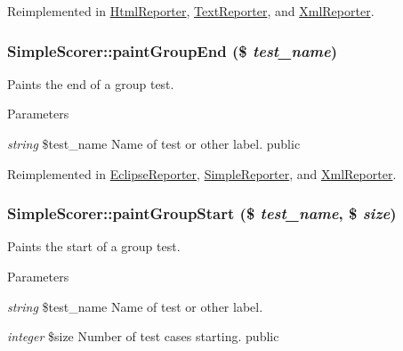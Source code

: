 Reimplemented in \hyperlink{class_html_reporter_ac759b018db079ff7f6cc45ee43d3ef12}{HtmlReporter}, \hyperlink{class_text_reporter_ac308a6d3632656270578474b0b752b06}{TextReporter}, and \hyperlink{class_xml_reporter_ac6997a24df6320a76066b801b1f99154}{XmlReporter}.\hypertarget{class_simple_scorer_a40b030cbba90f114374191cbed7d459d}{
\subsubsection[{paintGroupEnd}]{\setlength{\rightskip}{0pt plus 5cm}SimpleScorer::paintGroupEnd (\$ {\em test\_\-name})}}
\label{class_simple_scorer_a40b030cbba90f114374191cbed7d459d}
Paints the end of a group test. 
\begin{DoxyParams}{Parameters}
\item[{\em string}]\$test\_\-name Name of test or other label.  public \end{DoxyParams}


Reimplemented in \hyperlink{class_eclipse_reporter_aa0cb1e290d9ea75c0ac19efe06b55992}{EclipseReporter}, \hyperlink{class_simple_reporter_a2b6b699cadeb44f4dc666f3c94ac22be}{SimpleReporter}, and \hyperlink{class_xml_reporter_a448424e6e8bce6060c6ad6109fcb2300}{XmlReporter}.\hypertarget{class_simple_scorer_a738721074c609d1ced9010b57cd0779c}{
\subsubsection[{paintGroupStart}]{\setlength{\rightskip}{0pt plus 5cm}SimpleScorer::paintGroupStart (\$ {\em test\_\-name}, \/  \$ {\em size})}}
\label{class_simple_scorer_a738721074c609d1ced9010b57cd0779c}
Paints the start of a group test. 
\begin{DoxyParams}{Parameters}
\item[{\em string}]\$test\_\-name Name of test or other label. \item[{\em integer}]\$size Number of test cases starting.  public \end{DoxyParams}


